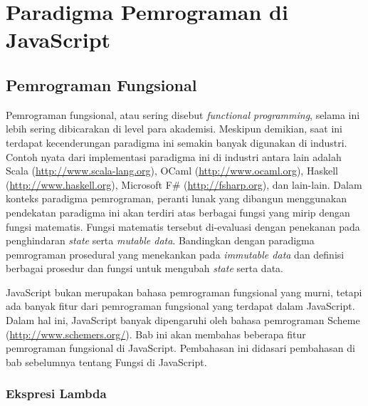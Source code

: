 \chapter{Paradigma Pemrograman di JavaScript}

\section{Pemrograman Fungsional}

Pemrograman fungsional, atau sering disebut \textit{functional programming}, selama ini lebih sering dibicarakan di level para akademisi. Meskipun demikian, saat ini terdapat kecenderungan paradigma ini semakin banyak digunakan di industri. Contoh nyata dari implementasi paradigma ini di industri antara lain adalah Scala (\url{http://www.scala-lang.org}), OCaml (\url{http://www.ocaml.org}), Haskell (\url{http://www.haskell.org}), Microsoft F# (\url{http://fsharp.org}), dan lain-lain. Dalam konteks paradigma pemrograman, peranti lunak yang dibangun menggunakan pendekatan paradigma ini akan terdiri atas berbagai fungsi yang mirip dengan fungsi matematis. Fungsi matematis tersebut di-evaluasi dengan penekanan pada penghindaran \textit{state} serta \textit{mutable data}. Bandingkan dengan paradigma pemrograman prosedural yang menekankan pada \textit{immutable data} dan definisi berbagai prosedur dan fungsi untuk mengubah \textit{state} serta data.

JavaScript bukan merupakan bahasa pemrograman fungsional yang murni, tetapi ada banyak fitur dari pemrograman fungsional yang terdapat dalam JavaScript. Dalam hal ini, JavaScript banyak dipengaruhi oleh bahasa pemrograman Scheme (\url{http://www.schemers.org/}). Bab ini akan membahas beberapa fitur pemrograman fungsional di JavaScript. Pembahasan ini didasari pembahasan di bab sebelumnya tentang Fungsi di JavaScript.


\subsection{Ekspresi Lambda}

